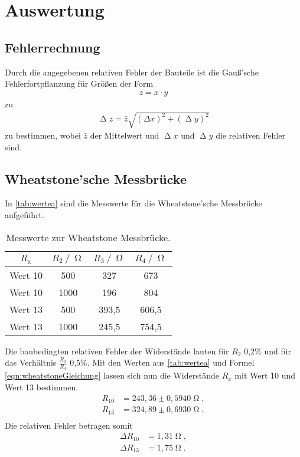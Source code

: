 \section{Auswertung}
\label{sec:Auswertung}

\subsection{Fehlerrechnung}
Durch die angegebenen relativen Fehler der Bauteile ist die Gauß'sche Fehlerfortpflanzung für Größen der Form
\begin{align*}
  z = x \cdot y    
\end{align*}
zu
\begin{align*}
  \upDelta z = \bar{z}\sqrt{(\Delta x)^2 + (\upDelta y)^2}    
\end{align*}
zu bestimmen, wobei $\bar{z}$ der Mittelwert und $\upDelta x$ und $\upDelta y$ die relativen Fehler sind.


\subsection{Wheatstone'sche Messbrücke}
In \autoref{tab:wertea} sind die Messwerte für die Wheatstone'sche Messbrücke aufgeführt.
\begin{table}[H]
  \centering
  \caption{Messwerte zur Wheatstone Messbrücke.}
  \label{tab:wertea}
  \begin{tabular}{c c c c}
    \toprule
    $R_{\text{x}}$ & $R_{\text{2}} \:/\: \upOmega$ & $R_{\text{3}} \:/\: \upOmega$ & $R_{\text{4}} \:/\: \upOmega$ \\
    \midrule
    Wert 10 & 500 & 327 & 673 \\
    Wert 10 & 1000 & 196 & 804 \\
    Wert 13 & 500 & 393,5 & 606,5 \\
    Wert 13 & 1000 & 245,5 & 754,5 \\
    \bottomrule
  \end{tabular}
\end{table}
Die baubedingten relativen Fehler der Widerstände lauten für $R_2$ 0,2\% und für das Verhältnis $\frac{R_3}{R_4}$ 0,5\%. Mit den Werten aus \autoref{tab:wertea} und
Formel \autoref{eqn:wheatstoneGleichung} lassen sich nun die Widerstände $R_x$ mit Wert 10 und Wert 13 bestimmen.
\begin{align*}
  R_{10} &= 243,36 \pm 0,5940 \upOmega, \\
  R_{13} &= 324,89 \pm 0,6930 \upOmega. \\
\end{align*}
Die relativen Fehler betragen somit
\begin{align*}
  \Delta R_{10} &= 1,31 \upOmega , \\
  \Delta R_{13} &= 1,75 \upOmega . \\
\end{align*}

